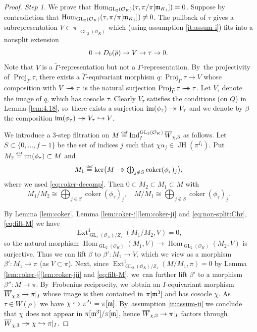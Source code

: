 \documentclass[JEP,XML,SOM,Unicode,NoFloatCountersInSection, NoEqCountersInSection,published]{cedram}
\newcommand\hto{\mathrel{\lhook\joinrel\to}}
\newcommand{\onto}{\mathchoice{\to\hspace*{-5mm}\to}{\mathrel{\hbox{$\to\hspace*{-2.85mm}\to$}}}{\to\hspace*{-3mm}\to}{\to\hspace*{-3mm}\to}}
\let\wt\widetilde
\newcommand{\defeq}{\stackrel{\textrm{\tiny{\upshape{def}}}}{=}}
\newcommand{\cO}{\mathcal{O}}
\newcommand{\rhobar}{\overline{\rho}}
\newcommand{\brho}{\overline{\rho}}
\DeclareMathOperator{\coker}{coker}
\DeclareMathOperator{\Ext}{Ext}
\DeclareMathOperator{\GL}{GL}
\DeclareMathOperator{\Hom}{Hom}
\DeclareMathOperator{\im}{im}
\DeclareMathOperator{\Ind}{Ind}
\DeclareMathOperator{\JH}{\mathrm{JH}}
\DeclareMathOperator{\Proj}{Proj}
\theoremstyle{plain}
\theoremstyle{definition}
\begin{document}
\begin{proof}[Proof. Step 1] We prove that $\Hom_{\GL_2(\cO_K)}(\tau,\pi/\pi[\m_{K_1}])=0$. Suppose by contradiction that $\Hom_{\GL_2(\cO_K)}(\tau,\pi/\pi[\m_{K_1}])\neq0$. The pullback of $\tau$ gives a subrepresentation $V\subset \pi|_{\GL_2(\cO_K)}$ which (using assumption \eqref{it:assum-i}) fits into a nonsplit extension
\begin{equation}
\label{eq:non-split:Chr}
0\to D_0(\brho)\to V\to \tau\ra0.
\end{equation}
Note that $V$ is a $\wt{\Gamma}$-representation but not a $\Gamma$-representation. By~the projectivity of $\Proj_{\wt{\Gamma}}\tau$, there exists a $\wt{\Gamma}$-equivariant morphism $q:\Proj_{\wt{\Gamma}}\tau\to V$ whose composition with $V\onto \tau$ is the natural surjection $\Proj_{\wt{\Gamma}}\tau\onto \tau$. Let $V_\tau$ denote the image of $q$, which has cosocle $\tau$. Clearly $V_{\tau}$ satisfies the conditions (on $Q$) in Lemma \ref{lem:4.18}, so~there exists a surjection $\im(\phi_{\tau})\onto V_\tau$ and we denote by $\beta$ the composition $\im(\phi_{\tau})\onto V_\tau \hto V$.

We introduce a 3-step filtration on $M\defeq\Ind_I^{\GL_2(\cO_K)}\overline{W}_{\chi,3}$ as follows. Let $S\subset \{0,\dots,f-1\}$ be the set of indices $j$ such that $\chi\alpha_j\in \JH(\pi^{I_1})$. Put $M_2\defeq \im(\phi_{\tau})\subset M$ and
\[
M_1\defeq \ker\bigl(M\textstyle\onto \bigoplus_{j\notin S}\coker(\phi_{\tau})_j\bigr),
\]
where we used \eqref{eq:coker-decomp}.
Then $0\subset M_2\subset M_1\subset M$ with
\begin{equation}\label{eq:filt-M}
M_1/M_2\cong \bigoplus_{j\in S}\coker(\phi_{\tau})_j,\quad M/M_1\cong \bigoplus_{j\notin S}\coker(\phi_{\tau})_j.
\end{equation}

By Lemma \ref{lem:coker}, Lemma \ref{lem:coker-j}\eqref{lem:coker-ji} and \eqref{eq:non-split:Chr}, \eqref{eq:filt-M} we have
\[
\Ext^1_{\GL_2(\cO_K)/Z_1}(M_1/M_2,V)=0,
\]
so the natural morphism
$\Hom_{\GL_2(\cO_K)}(M_1,V)\to \Hom_{\GL_2(\cO_K)}(M_2,V)$ is surjective. Thus we can lift $\beta$ to $\beta':M_1\to V$, which we view as a morphism $\beta':M_1\to \pi$ (as $V\subset \pi$). Next, since $\Ext^1_{\GL_2(\cO_K)/Z_1}(M/M_1,\pi)=0$ by Lemma \ref{lem:coker-j}\eqref{lem:coker-jii} and \eqref{eq:filt-M}, we~can further lift $\beta'$ to a morphism $\beta'':M\to \pi$. By~Frobenius reciprocity, we~obtain an $I$-equivariant morphism $\overline{W}_{\chi,3}\rightarrow\pi|_I$ whose image is then contained in $\pi[\mathfrak{m}^3]$ and has cosocle $\chi$. As~$\tau\in W(\rhobar)$ we have $\chi\hto \pi^{I_1}=\pi[\m]$. By~assumption \eqref{it:assum-ii} we conclude that $\chi$ does not appear in $\pi[\mathfrak{m}^3]/\pi[\mathfrak{m}]$, hence $\overline{W}_{\chi,3}\rightarrow\pi|_I$ factors through $\overline{W}_{\chi,3}\onto \chi\hto \pi|_{I}$.


\end{proof}
\end{document}
